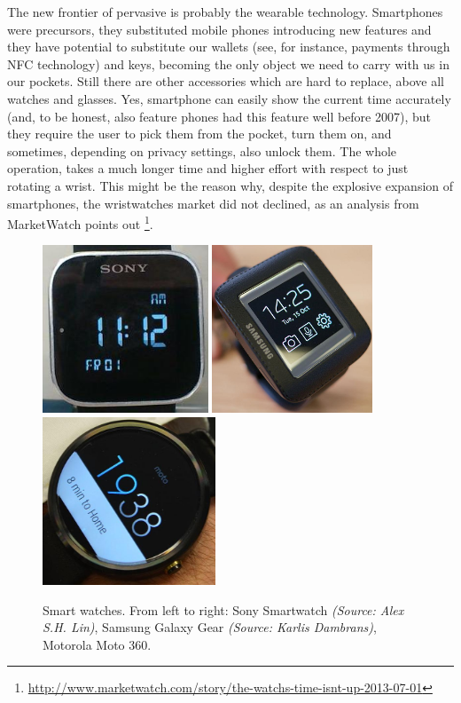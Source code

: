 \documentclass[12pt,a4paper,twoside,openright]{book}
\begin{document}
The new frontier of pervasive is probably the wearable technology. Smartphones were precursors, they substituted mobile phones introducing new features and they have potential to substitute our wallets (see, for instance, payments through NFC technology) and keys, becoming the only object we need to carry with us in our pockets.
%
Still there are other accessories which are hard to replace, above all watches and glasses.
%
Yes, smartphone can easily show the current time accurately (and, to be honest, also feature phones had this feature well before 2007), but they require the user to pick them from the pocket, turn them on, and sometimes, depending on privacy settings, also unlock them.
%
The whole operation, takes a much longer time and higher effort with respect to just rotating a wrist.
%
This might be the reason why, despite the explosive expansion of smartphones, the wristwatches market did not declined, as an analysis from MarketWatch points out \footnote{\url{http://www.marketwatch.com/story/the-watchs-time-isnt-up-2013-07-01}}.

\begin{figure}
	\centering
	\includegraphics[height=5cm]{img/sony-sw}
	\includegraphics[height=5cm]{img/samsung-gg}
	\includegraphics[height=5cm]{img/moto360}
	\caption[Smart watches]{Smart watches. From left to right: Sony Smartwatch \emph{(Source: Alex S.H. Lin)}, Samsung Galaxy Gear \emph{(Source: Karlis Dambrans)}, Motorola Moto 360.}
	\label{img:watches}
\end{figure}
\end{document}
